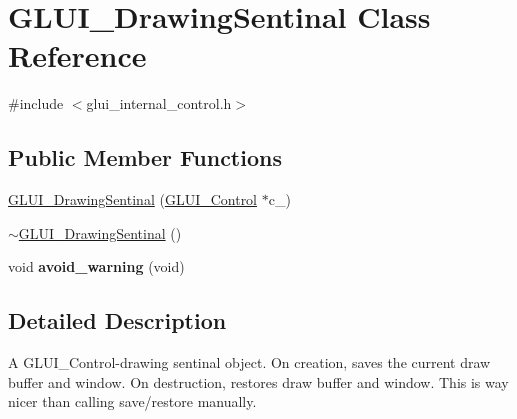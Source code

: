 \hypertarget{classGLUI__DrawingSentinal}{\section{G\-L\-U\-I\-\_\-\-Drawing\-Sentinal Class Reference}
\label{classGLUI__DrawingSentinal}
}


{\ttfamily \#include $<$glui\-\_\-internal\-\_\-control.\-h$>$}

\subsection*{Public Member Functions}
\begin{DoxyCompactItemize}
\item 
\hyperlink{classGLUI__DrawingSentinal_a36a3e67bc912d8d6bb541d4cb5222d00}{G\-L\-U\-I\-\_\-\-Drawing\-Sentinal} (\hyperlink{classGLUI__Control}{G\-L\-U\-I\-\_\-\-Control} $\ast$c\-\_\-)
\item 
\hyperlink{classGLUI__DrawingSentinal_a5d51d02a9b128b94552cf48d50af21f8}{$\sim$\-G\-L\-U\-I\-\_\-\-Drawing\-Sentinal} ()
\item 
\hypertarget{classGLUI__DrawingSentinal_a105eb4ebdb5793929029b42effb19ef3}{void {\bfseries avoid\-\_\-warning} (void)}\label{classGLUI__DrawingSentinal_a105eb4ebdb5793929029b42effb19ef3}

\end{DoxyCompactItemize}


\subsection{Detailed Description}
A G\-L\-U\-I\-\_\-\-Control-\/drawing sentinal object. On creation, saves the current draw buffer and window. On destruction, restores draw buffer and window. This is way nicer than calling save/restore manually. 

